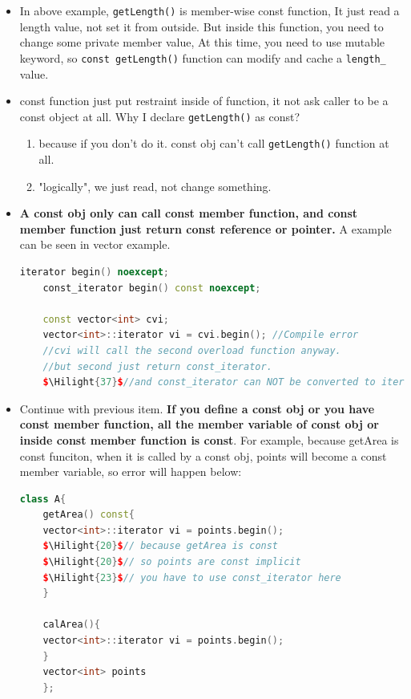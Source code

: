 \documentclass[a4paper,11pt,twoside]{book}
\newcommand{\Hilight}[1]{\makebox[0pt][l]{\color{yellow}\rule[-3pt]{#1em}{11pt}}}
\newcommand{\Hilight}[1]{}
\begin{document}
\begin{itemize}
	
	\item In above example, \texttt{getLength()} is member-wise const function, It just read a length value, not set it from outside. But inside this function, you need to change some private member value, At this time, you need to use mutable keyword, so \texttt{const getLength()} function can modify and cache a \texttt{length\_} value.
	
	\item const function just put restraint inside of function, it not ask caller to be a const object at all. Why I declare \texttt{getLength()} as const?
	\begin{enumerate}
		\item because if you don't do it. const obj can't call \texttt{getLength()} function at all. 
		\item "logically", we just read, not change something.
	\end{enumerate}
	
	
	\item \textbf{A const obj only can call const member function, and const member function just return const reference or pointer.} A example can be seen in vector example.  
	
	\begin{lstlisting}[frame=single, language=c++]
	iterator begin() noexcept;
	const_iterator begin() const noexcept;
	
	const vector<int> cvi;
	vector<int>::iterator vi = cvi.begin(); //Compile error
	//cvi will call the second overload function anyway.
	//but second just return const_iterator. 
	$\Hilight{37}$//and const_iterator can NOT be converted to iterator implicitly.
	\end{lstlisting}
	
	\item Continue with previous item.\textbf{ If you define a const obj or you have const member function, all the member variable of const obj or inside const member function is const}. For example, because getArea is const funciton, when it is called by a const obj, points will become a const member variable, so error will happen below: 
	
	\begin{lstlisting}[frame=single, language=c++]
	class A{
	getArea() const{
	vector<int>::iterator vi = points.begin();
	$\Hilight{20}$// because getArea is const
	$\Hilight{20}$// so points are const implicit
	$\Hilight{23}$// you have to use const_iterator here
	}
	
	calArea(){
	vector<int>::iterator vi = points.begin();
	}
	vector<int> points
	};
	

\end{lstlisting}
\end{itemize}
\end{document}

